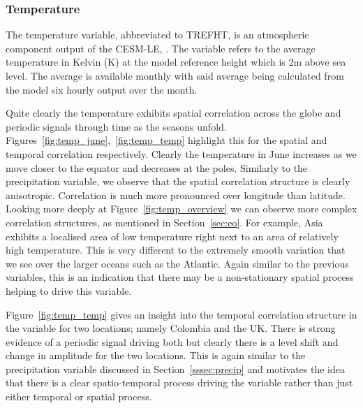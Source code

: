 \subsubsection{Temperature \label{sssec:temp}}
The temperature variable, abbreviated to TREFHT, is an atmospheric component output of the CESM-LE, \citep{kay_community_2015}.
The variable refers to the average temperature in Kelvin ($\si{\kelvin}$) at the model reference height which is $2\si{\meter}$ above sea level.
The average is available monthly with said average being calculated from the model six hourly output over the month.

Quite clearly the temperature exhibits spatial correlation across the globe and periodic signals through time as the seasons unfold.
Figures~\ref{fig:temp_june},~\ref{fig:temp_temp} highlight this for the spatial and temporal correlation respectively.
Clearly the temperature in June increases as we move closer to the equator and decreases at the poles. 
Similarly to the precipitation variable, we observe that the spatial correlation structure is clearly anisotropic. 
Correlation is much more pronounced over longitude than latitude. 
Looking more deeply at Figure~\ref{fig:temp_overview} we can observe more complex correlation structures, as mentioned in Section~\ref{sec:eo}. 
For example, Asia exhibits a localised area of low temperature right next to an area of relatively high temperature. 
This is very different to the extremely smooth variation that we see over the larger oceans such as the Atlantic. 
Again similar to the previous variables, this is an indication that there may be a non-stationary spatial process helping to drive this variable.

Figure~\ref{fig:temp_temp} gives an insight into the temporal correlation structure in the variable for two locations; namely Colombia and the UK. 
There is strong evidence of a periodic signal driving both but clearly there is a level shift and change in amplitude for the two locations. 
This is again similar to the precipitation variable discussed in Section~\ref{sssec:precip} and motivates the idea that there is a clear spatio-temporal process driving the variable rather than just either temporal or spatial process.

